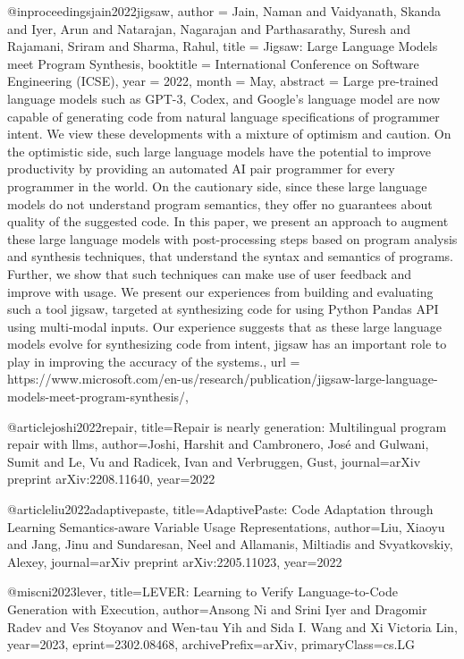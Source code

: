 @inproceedings{jain2022jigsaw,
author = {Jain, Naman and Vaidyanath, Skanda and Iyer, Arun and Natarajan, Nagarajan and Parthasarathy, Suresh and Rajamani, Sriram and Sharma, Rahul},
title = {Jigsaw: Large Language Models meet Program Synthesis},
booktitle = {International Conference on Software Engineering (ICSE)},
year = {2022},
month = {May},
abstract = {Large pre-trained language models such as GPT-3, Codex, and Google's language model are now capable of generating code from natural language specifications of programmer intent. We view these developments with a mixture of optimism and caution. On the optimistic side, such large language models have the potential to improve productivity by providing an automated AI pair programmer for every programmer in the world. On the cautionary side, since these large language models do not understand program semantics, they offer no guarantees about quality of the suggested code. In this paper, we present an approach to augment these large language models with post-processing steps based on program analysis and synthesis techniques, that understand the syntax and semantics of programs. Further, we show that such techniques can make use of user feedback and improve with usage. We present our experiences from building and evaluating such a tool jigsaw, targeted at synthesizing code for using Python Pandas API using multi-modal inputs. Our experience suggests that as these large language models evolve for synthesizing code from intent, jigsaw has an important role to play in improving the accuracy of the systems.},
url = {https://www.microsoft.com/en-us/research/publication/jigsaw-large-language-models-meet-program-synthesis/},
}

@article{joshi2022repair,
  title={Repair is nearly generation: Multilingual program repair with llms},
  author={Joshi, Harshit and Cambronero, Jos{\'e} and Gulwani, Sumit and Le, Vu and Radicek, Ivan and Verbruggen, Gust},
  journal={arXiv preprint arXiv:2208.11640},
  year={2022}
}

@article{liu2022adaptivepaste,
  title={AdaptivePaste: Code Adaptation through Learning Semantics-aware Variable Usage Representations},
  author={Liu, Xiaoyu and Jang, Jinu and Sundaresan, Neel and Allamanis, Miltiadis and Svyatkovskiy, Alexey},
  journal={arXiv preprint arXiv:2205.11023},
  year={2022}
}

@misc{ni2023lever,
      title={LEVER: Learning to Verify Language-to-Code Generation with Execution},
      author={Ansong Ni and Srini Iyer and Dragomir Radev and Ves Stoyanov and Wen-tau Yih and Sida I. Wang and Xi Victoria Lin},
      year={2023},
      eprint={2302.08468},
      archivePrefix={arXiv},
      primaryClass={cs.LG}
}

